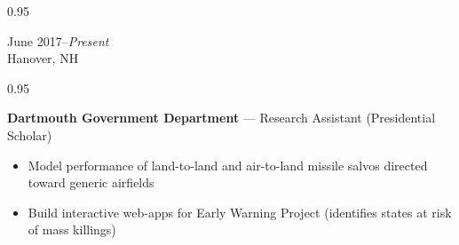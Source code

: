 \documentclass[a4paper,9pt]{article}
\newcommand{\mainMarginBottom}{\vspace*{2.5pt}}
\newcommand{\newLine}{\\}
\newcommand{\doubleColumnGap}{\hspace{4mm}}
\newcommand{\withinSectionMarginBetween}{\vspace{-2.75ex}}
\newcommand{\mainLineSpacing}{0.95}
\begin{document}
\begin{minipage}[t]{0.20\linewidth}
  \begin{small}
    \begin{spacing}\mainLineSpacing{}
      \begin{flushright}
        June 2017--\textit{Present}
        \newLine{}
        \mainMarginBottom{}
        Hanover, NH
      \end{flushright}
    \end{spacing}
  \end{small}
\end{minipage}
\doubleColumnGap{}
\begin{minipage}[t]{0.75\linewidth}
  \begin{small}
    \begin{spacing}\mainLineSpacing{}
      \begin{flushleft}
        \textbf{Dartmouth Government Department} --- Research Assistant (Presidential Scholar)
        \mainMarginBottom{}
        \begin{itemize}[itemsep=1pt,topsep=0pt,leftmargin=*]
          \item Model performance of land-to-land and air-to-land missile salvos directed toward generic airfields
          \item Build interactive web-apps for Early Warning Project (identifies states at risk of mass killings)
        \end{itemize}
      \end{flushleft}
    \end{spacing}
  \end{small}
\end{minipage}

\withinSectionMarginBetween{}
\end{document}
